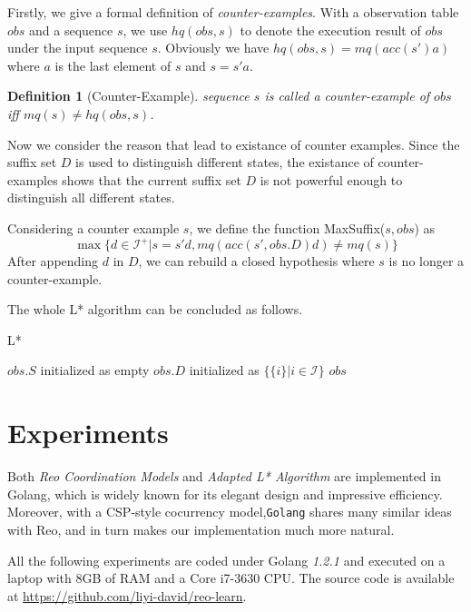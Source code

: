 \documentclass[conference, a4paper]{IEEEtran}
\newtheorem{definition}{Definition}
\begin{document}
Firstly, we give a formal definition of \emph{counter-examples}. With a observation table $obs$ and
a sequence $s$, we use $hq(obs,s)$ to denote the execution result of $obs$ under the input sequence
$s$. Obviously we have $hq(obs,s) = mq(acc(s')a)$ where $a$ is the last element of $s$ and $s=s'a$.

\begin{definition}[Counter-Example]
  sequence $s$ is called a counter-example of $obs$ iff $mq(s)\neq hq(obs,s)$.
\end{definition}

Now we consider the reason that lead to existance of counter examples. Since
the suffix set $D$ is used to distinguish different states, the existance of counter-examples
shows that the current suffix set $D$ is not powerful enough to distinguish all different states.

Considering a counter example $s$, we define the function MaxSuffix($s,obs$) as
\[
\max\{d\in\mathcal{I}^+|s=s'd, mq(acc(s',obs.D)d)\neq mq(s)\}
\]
After appending $d$ in $D$, we can rebuild a closed hypothesis where $s$ is no longer a
counter-example.

The whole L* algorithm can be concluded as follows.
\begin{algorithm} 
  \caption{L*} 
  \label{alg:lstar}
  $obs.S$ initialized as empty\;
  $obs.D$ initialized as $\{\{i\}|i\in\mathcal{I}\}$\;
  \Return $obs$\; 
\end{algorithm}




\section{Experiments} 
\label{sec:experiment}

Both \emph{Reo Coordination Models} and \emph{Adapted L* Algorithm} are implemented in
Golang\cite{golang}, which is widely known for its elegant design and impressive efficiency.
Moreover, with a CSP-style\cite{DBLP:books/ph/Hoare85} cocurrency model,\texttt{Golang} shares many
similar ideas with Reo, and in turn makes our implementation much more natural.

All the following experiments are coded under Golang \emph{1.2.1} and executed on a laptop with 8GB
of RAM and a Core i7-3630 CPU. The source code is available at
\url{https://github.com/liyi-david/reo-learn}.
\end{document}

